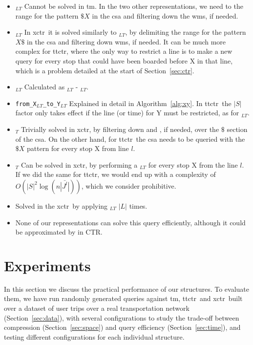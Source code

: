 \begin{itemize}
        \item \texttt{\startX$_{LT}$} Cannot be solved in \gls{tm}. In the two other representations, we need to the range for the pattern $\$X$ in the \gls{csa} and filtering down the \gls{wm}s, if needed.
        \item \texttt{\endX$_{LT}$} In \gls{xctr}~it is solved similarly to \texttt{\startX$_{LT}$}, by delimiting the range for the pattern $X\$$ in the \gls{csa} and filtering down \gls{wm}s, if needed. It can be much more complex for \gls{ttctr}, where the only way to restrict a line is to make a new query for every stop that could have been boarded before X in that line, which is a problem detailed at the start of Section~\ref{sec:ctr}.
        \item \texttt{\switchX$_{LT}$} Calculated as \boardX$_{LT}$ - \startX$_{LT}$.
        \item \texttt{from\_X$_{LT}$\_to\_Y$_{LT}$} Explained in detail in Algorithm~\ref{alg:xy}. In \gls{ttctr}~the $|S|$ factor only takes effect if the line (or time) for Y must be restricted, as for \texttt{\endX$_{LT}$}.
        \item \texttt{\startL$_T$} Trivially solved in \gls{xctr}, by filtering down  and , if needed, over the $\$$ section of the \gls{csa}. On the other hand, for \gls{ttctr}~the \gls{csa} needs to be queried with the $\$X$ pattern for every stop X from line $l$.
        \item \texttt{\endL$_T$} Can be solved in \gls{xctr}, by performing a \endX$_{LT}$ for every stop X from the line $l$. If we did the same for \gls{ttctr}, we would end up with a complexity of $O(|S|^2\log(n\bar{|J^l|}))$, which we consider prohibitive.
        \item \texttt{\startT} Solved in the \gls{xctr}~by applying \texttt{\startX$_{LT}$} $|L|$ times.
        \item \texttt{\endT} None of our representations can solve this query efficiently, although it could be approximated by \texttt{\startT} in CTR.
    \end{itemize}
	
\section{Experiments}
\label{sec:newctr:exp}
	In this section we discuss the practical performance of our structures. To evaluate them, we have run randomly generated queries against \gls{tm}, \gls{ttctr}~and \gls{xctr}~built over a dataset of user trips over a real transportation network (Section~\ref{sec:data}), with several configurations to study the trade-off between compression (Section~\ref{sec:space}) and query efficiency (Section~\ref{sec:time}), and testing different configurations for each individual structure.

